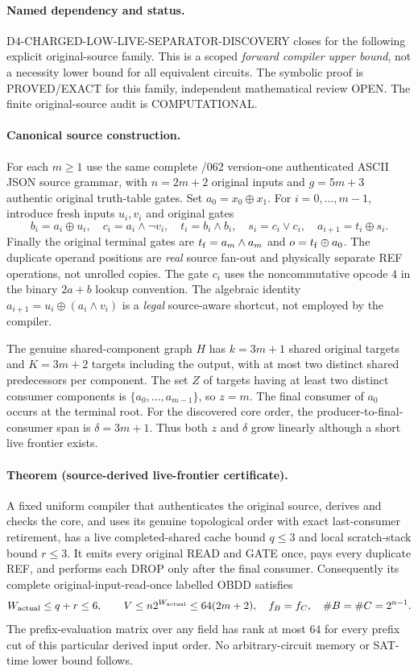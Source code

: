 \documentclass[11pt]{article}
\begin{document}
\paragraph{Named dependency and status.}
D4-CHARGED-LOW-LIVE-SEPARATOR-DISCOVERY closes for the
following explicit original-source family. This is a scoped
\emph{forward compiler upper bound}, not a necessity lower bound for
all equivalent circuits. The symbolic proof is PROVED/EXACT
for this family, independent mathematical review OPEN.
The finite original-source audit is COMPUTATIONAL.

\paragraph{Canonical source construction.}
For each $m\ge1$ use the same complete /062 version-one
authenticated ASCII JSON source grammar, with
$n=2m+2$ original inputs and $g=5m+3$ authentic original
truth-table gates. Set $a_0=x_0\oplus x_1$.
For $i=0,\ldots,m-1$, introduce fresh inputs $u_i,v_i$ and
original gates
\[
 b_i=a_i\oplus u_i,\quad
 c_i=a_i\wedge\neg v_i,\quad
 t_i=b_i\wedge b_i,\quad
 s_i=c_i\vee c_i,\quad
 a_{i+1}=t_i\oplus s_i.
\]
Finally the original terminal gates are
$t_{\rm f}=a_m\wedge a_m$ and $o=t_{\rm f}\oplus a_0$.
The duplicate operand positions are \emph{real} source
fan-out and physically separate REF operations, not unrolled
copies. The gate $c_i$ uses the noncommutative opcode $4$ in
the binary $2a+b$ lookup convention. The algebraic identity
$a_{i+1}=u_i\oplus(a_i\wedge v_i)$ is a \emph{legal}
source-aware shortcut, not employed by the compiler.

The genuine shared-component graph $H$ has
$k=3m+1$ shared original targets and $K=3m+2$
targets including the output, with at most two distinct
shared predecessors per component. The set $Z$ of targets
having at least two distinct consumer components is
$\{a_0,\ldots,a_{m-1}\}$, so $z=m$.
The final consumer of $a_0$ occurs at the terminal root.
For the discovered core order, the producer-to-final-consumer
span is $\delta=3m+1$. Thus both $z$ and $\delta$
grow linearly although a short live frontier exists.

\paragraph{Theorem (source-derived live-frontier certificate).}
A fixed uniform compiler that authenticates the original source,
derives and checks the core, and uses its genuine topological order
with exact last-consumer retirement, has a live completed-shared
cache bound $q\le3$ and local scratch-stack bound $r\le3$.
It emits every original READ and GATE once, pays every duplicate REF,
and performs each DROP only after the final consumer.
Consequently its complete original-input-read-once labelled OBDD
satisfies
\[
 W_{\rm actual}\le q+r\le6,\qquad
 V\le n2^{W_{\rm actual}}\le64(2m+2),\quad
 f_B=f_C,\quad \#B=\#C=2^{n-1}.
\]
The prefix-evaluation matrix over any field has rank at most $64$
for every prefix cut of this particular derived input order.
No arbitrary-circuit memory or SAT-time lower bound follows.
\end{document}
